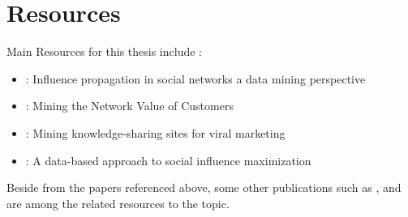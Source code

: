 \documentclass[english]{tktltiki}
\begin{document}
\section{Resources}
Main Resources for this thesis include :
\begin{itemize}
\item \cite{Bon11} : Influence propagation in social networks a data mining perspective
\item \cite{domingo01} : Mining the Network Value of Customers
\item \cite{domingo02} : Mining knowledge-sharing sites for viral marketing
\item \cite{goyal11}: A data-based approach to social influence maximization
\end{itemize}
Beside from the papers referenced above, some other publications such as \cite{goyal10}, and \cite{cheng13} are among the related resources to the topic. 
\pagebreak



\lastpage

\pagestyle{empty}
\end{document}

